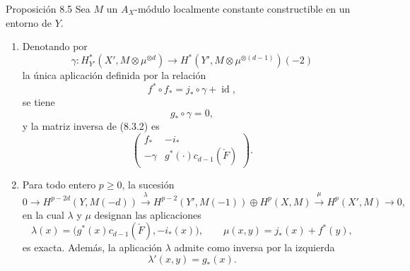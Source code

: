 \begin{statement}{Proposición 8.5}
Sea $M$ un $A_X$-módulo localmente constante constructible en un entorno de $Y$.
\begin{enumerate}[label=\alph*)]
\item Denotando por
\[
\gamma:H_{Y'}^*(X',M\otimes\mu^{\otimes d})\to
H^*(Y',M\otimes\mu^{\otimes(d-1)})(-2)
\]
la única aplicación definida por la relación
\[
f^*\circ f_* = j_*\circ\gamma+\operatorname{id},
\tag{8.5.1}
\]
se tiene
\[
g_*\circ\gamma=0,
\tag{8.5.2}
\]
y la matriz inversa de (8.3.2) es
\[
\begin{pmatrix}
f_*&-i_*\\
-\gamma&g^*(\cdot)c_{d-1}(\check F)
\end{pmatrix}.
\tag{8.5.3}
\]
\item Para todo entero $p\ge0$, la sucesión
\[
0\to H^{p-2d}(Y,M(-d))
\xrightarrow{\lambda}
H^{p-2}(Y',M(-1))\oplus H^p(X,M)
\xrightarrow{\mu}
H^p(X',M)\to0,
\]
en la cual $\lambda$ y $\mu$ designan las aplicaciones
\[
\lambda(x)=\bigl(g^*(x)c_{d-1}(\check F),-i_*(x)\bigr),
\qquad
\mu(x,y)=j_*(x)+f^*(y),
\]
es exacta. Además, la aplicación $\lambda$ admite como inversa por la izquierda
\[
\lambda'(x,y)=g_*(x).
\]
\end{enumerate}
\end{statement}
